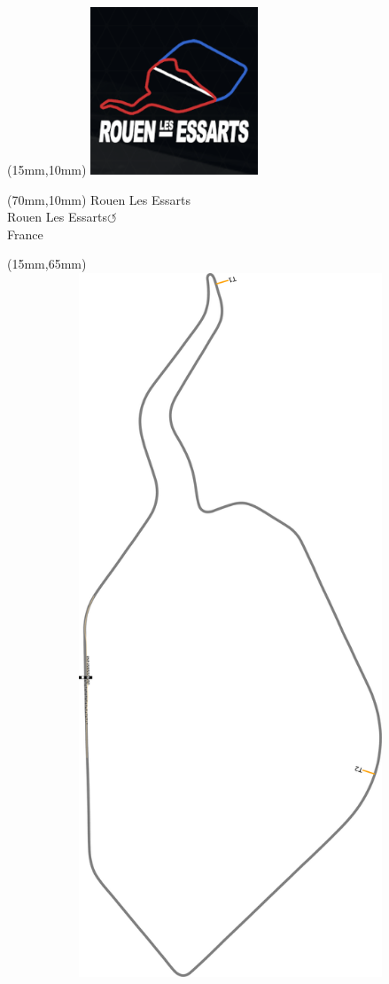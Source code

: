 \null\newpage
\begin{textblock*}{50mm}(15mm,10mm)%
\includegraphics[width=50mm]{LG/ROUE.png}
\end{textblock*}
\begin{textblock*}{130mm}(70mm,10mm)%
{\fontsize{20}{20}\selectfont Rouen Les Essarts\\}
{\fontsize{16}{16}\selectfont Rouen Les Essarts\hfill \huge$\circlearrowleft$\\}
{\fontsize{12}{12}\selectfont France\\}
\end{textblock*}
\begin{textblock*}{185mm}(15mm,65mm)%
\centering
\mbox{\includegraphics[width=185mm,height=210mm,keepaspectratio]{PT/ROUE.pdf}}
\end{textblock*}
